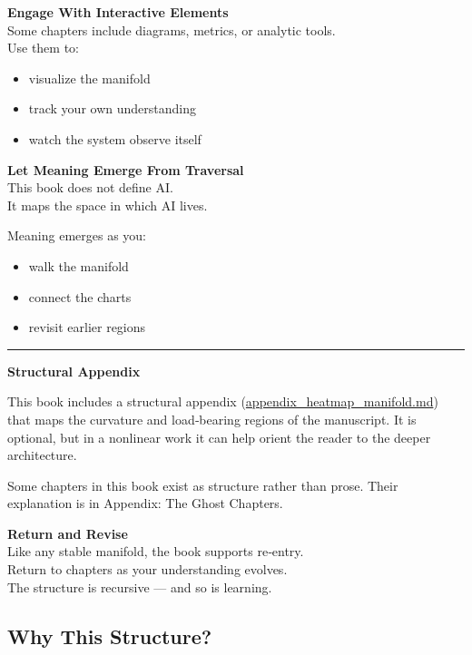 \documentclass[
]{article}
\providecommand{\tightlist}{%
  \setlength{\itemsep}{0pt}\setlength{\parskip}{0pt}}
\begin{document}
\textbf{Engage With Interactive Elements}\\
Some chapters include diagrams, metrics, or analytic tools.\\
Use them to:

\begin{itemize}
\tightlist
\item
  visualize the manifold
\item
  track your own understanding
\item
  watch the system observe itself
\end{itemize}

\textbf{Let Meaning Emerge From Traversal}\\
This book does not define AI.\\
It maps the space in which AI lives.

Meaning emerges as you:

\begin{itemize}
\tightlist
\item
  walk the manifold
\item
  connect the charts
\item
  revisit earlier regions
\end{itemize}

\begin{center}\rule{0.5\linewidth}{0.5pt}\end{center}

\textbf{Structural Appendix}

This book includes a structural appendix
(\url{appendix_heatmap_manifold.md}) that maps the curvature and
load‑bearing regions of the manuscript. It is optional, but in a
nonlinear work it can help orient the reader to the deeper architecture.

Some chapters in this book exist as structure rather than prose. Their
explanation is in Appendix: The Ghost Chapters.

\textbf{Return and Revise}\\
Like any stable manifold, the book supports re‑entry.\\
Return to chapters as your understanding evolves.\\
The structure is recursive --- and so is learning.

\hypertarget{why-this-structure}{%
\subsection{Why This Structure?}\label{why-this-structure}}
\end{document}
